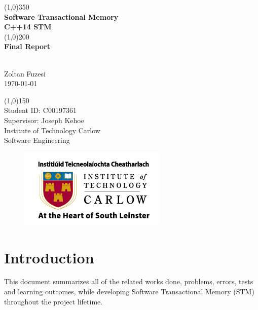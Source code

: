 \documentclass[12pt]{article}
\begin{document}
\begin{titlepage}
	\begin{center}
	\line(1,0){350}\\
	[0.3 cm]
	\huge{\textbf{Software Transactional Memory\\[0.3 cm]C++14 STM\\ }} 
	\line(1,0){200}\\
	[0.3 cm]
	\huge{\textbf{Final Report }} 
		\begin{LARGE}
		\\[0.3 cm]Zoltan Fuzesi\\
		\today
		\end{LARGE}
		
		\begin{LARGE}
		\line(1,0){150}\\
		[1.0 cm]
		Student ID: C00197361\\
		Supervisor: Joseph Kehoe\\
		\color{gray}Institute of Technology Carlow\\
		\color{gray}Software Engineering
		\end{LARGE}
		
\begin{figure}[h!]
\centering
\includegraphics[scale=0.7]{Pictures/carlow.png}

\end{figure}
		
	\end{center}
\end{titlepage}

\tableofcontents


\clearpage
{}
\setcounter{page}{1}

\section{Introduction}
This document summarizes all of the related works done, problems, errors, tests and learning outcomes, while developing Software Transactional Memory (STM) throughout the project lifetime.\\ 
\end{document}
